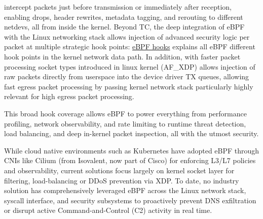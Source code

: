 \documentclass [11pt, proquest] {uwthesis}[2020/02/24]
\begin{document}
intercept packets just before transmission or immediately after reception, enabling drops, header rewrites, metadata tagging, and rerouting to different netdevs, all from inside the kernel.
Beyond TC, the deep integration of eBPF with the Linux networking stack allows injection of advanced security logic per packet at multiple strategic hook points: \hyperref[sec:ebpf-hooks-kernel-network-datapath]{eBPF hooks} explains all eBPF different hook points in the kernel network data path. In addition, with faster packet processing socket types introduced in linux kernel (AF\_XDP) allows injection of raw packets directly from userspace into the device driver TX queues, allowing fast egress packet processing by passing kernel network stack particularly highly relevant for high egress packet processing.


This broad hook coverage allows eBPF to power everything from performance profiling, network observability, and rate limiting to runtime threat detection, load balancing, and deep in-kernel packet inspection, all with the utmost security.

While cloud native environments such as Kubernetes have adopted eBPF through CNIs like Cilium (from Isovalent, now part of Cisco) for enforcing L3/L7 policies and observability, current solutions focus largely on kernel socket layer for filtering, load-balancing or DDoS prevention via XDP. To date, no industry solution has comprehensively leveraged eBPF across the Linux network stack, syscall interface, and security subsystems to proactively prevent DNS exfiltration or disrupt active Command-and-Control (C2) activity in real time.
\end{document}
